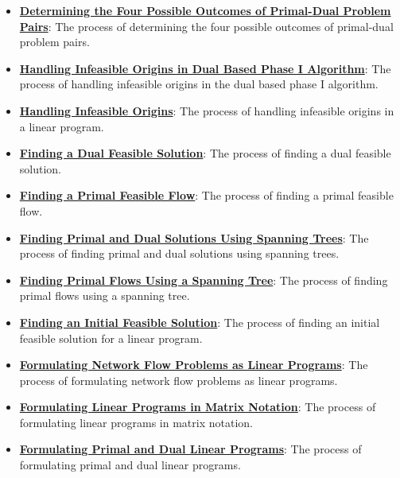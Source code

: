 \documentclass{article}%
\begin{document}
\begin{itemize}[leftmargin=*]
\item \href{https://www.math.purdue.edu/~yipn/421/2024-11-14-NetAppls.pdf#page=7}{\textbf{Determining the Four Possible Outcomes of Primal{-}Dual Problem Pairs}}: The process of determining the four possible outcomes of primal-dual problem pairs.%
\item \href{https://www.math.purdue.edu/~yipn/421/2024-11-14-NetAppls.pdf#page=7}{\textbf{Handling Infeasible Origins in Dual Based Phase I Algorithm}}: The process of handling infeasible origins in the dual based phase I algorithm.%
\item \href{https://www.math.purdue.edu/~yipn/421/2024-11-14-NetAppls.pdf#page=7}{\textbf{Handling Infeasible Origins}}: The process of handling infeasible origins in a linear program.%
\item \href{https://www.math.purdue.edu/~yipn/421/2024-11-14-NetAppls.pdf#page=7}{\textbf{Finding a Dual Feasible Solution}}: The process of finding a dual feasible solution.%
\item \href{https://www.math.purdue.edu/~yipn/421/2024-11-14-NetAppls.pdf#page=7}{\textbf{Finding a Primal Feasible Flow}}: The process of finding a primal feasible flow.%
\item \href{https://www.math.purdue.edu/~yipn/421/2024-11-14-NetAppls.pdf#page=7}{\textbf{Finding Primal and Dual Solutions Using Spanning Trees}}: The process of finding primal and dual solutions using spanning trees.%
\item \href{https://www.math.purdue.edu/~yipn/421/2024-11-14-NetAppls.pdf#page=7}{\textbf{Finding Primal Flows Using a Spanning Tree}}: The process of finding primal flows using a spanning tree.%
\item \href{https://www.math.purdue.edu/~yipn/421/2024-11-14-NetAppls.pdf#page=7}{\textbf{Finding an Initial Feasible Solution}}: The process of finding an initial feasible solution for a linear program.%
\item \href{https://www.math.purdue.edu/~yipn/421/2024-11-14-NetAppls.pdf#page=7}{\textbf{Formulating Network Flow Problems as Linear Programs}}: The process of formulating network flow problems as linear programs.%
\item \href{https://www.math.purdue.edu/~yipn/421/2024-11-14-NetAppls.pdf#page=7}{\textbf{Formulating Linear Programs in Matrix Notation}}: The process of formulating linear programs in matrix notation.%
\item \href{https://www.math.purdue.edu/~yipn/421/2024-11-14-NetAppls.pdf#page=7}{\textbf{Formulating Primal and Dual Linear Programs}}: The process of formulating primal and dual linear programs.%

\end{itemize}
\end{document}

